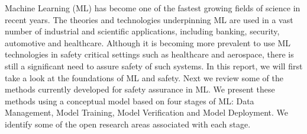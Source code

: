 
Machine Learning (ML) has become one of the fastest growing fields of science in recent years. The theories and technologies underpinning ML are used in a vast number of industrial and scientific applications, including banking, security, automotive and healthcare. Although it is becoming more prevalent to use ML technologies in safety critical settings such as healthcare and aerospace, there is still a significant need to assure safety of such systems. In this report, we will first take a look at the foundations of ML and safety. Next we review some of the methods currently developed for safety assurance in ML. We present these methods using a conceptual model based on four stages of ML: Data Management, Model Training, Model Verification and Model Deployment. We identify some of the open research areas associated with each stage. 